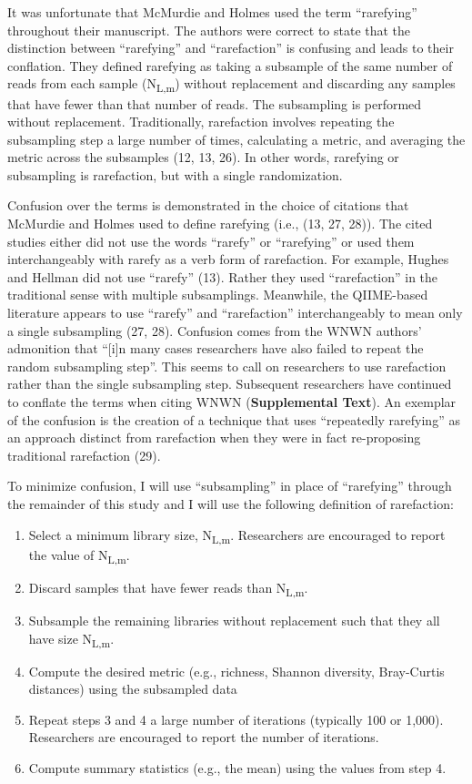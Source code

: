 \documentclass[
]{article}
\providecommand{\tightlist}{%
  \setlength{\itemsep}{0pt}\setlength{\parskip}{0pt}}
\begin{document}
It was unfortunate that McMurdie and Holmes used the term ``rarefying''
throughout their manuscript. The authors were correct to state that the
distinction between ``rarefying'' and ``rarefaction'' is confusing and
leads to their conflation. They defined rarefying as taking a subsample
of the same number of reads from each sample (N\textsubscript{L,m})
without replacement and discarding any samples that have fewer than that
number of reads. The subsampling is performed without replacement.
Traditionally, rarefaction involves repeating the subsampling step a
large number of times, calculating a metric, and averaging the metric
across the subsamples (12, 13, 26). In other words, rarefying or
subsampling is rarefaction, but with a single randomization.

Confusion over the terms is demonstrated in the choice of citations that
McMurdie and Holmes used to define rarefying (i.e., (13, 27, 28)). The
cited studies either did not use the words ``rarefy'' or ``rarefying''
or used them interchangeably with rarefy as a verb form of rarefaction.
For example, Hughes and Hellman did not use ``rarefy'' (13). Rather they
used ``rarefaction'' in the traditional sense with multiple
subsamplings. Meanwhile, the QIIME-based literature appears to use
``rarefy'' and ``rarefaction'' interchangeably to mean only a single
subsampling (27, 28). Confusion comes from the WNWN authors' admonition
that ``{[}i{]}n many cases researchers have also failed to repeat the
random subsampling step''. This seems to call on researchers to use
rarefaction rather than the single subsampling step. Subsequent
researchers have continued to conflate the terms when citing WNWN
(\textbf{Supplemental Text}). An exemplar of the confusion is the
creation of a technique that uses ``repeatedly rarefying'' as an
approach distinct from rarefaction when they were in fact re-proposing
traditional rarefaction (29).

To minimize confusion, I will use ``subsampling'' in place of
``rarefying'' through the remainder of this study and I will use the
following definition of rarefaction:

\begin{enumerate}
\def\labelenumi{\arabic{enumi}.}
\tightlist
\item
  Select a minimum library size, N\textsubscript{L,m}. Researchers are
  encouraged to report the value of N\textsubscript{L,m}.
\item
  Discard samples that have fewer reads than N\textsubscript{L,m}.
\item
  Subsample the remaining libraries without replacement such that they
  all have size N\textsubscript{L,m}.
\item
  Compute the desired metric (e.g., richness, Shannon diversity,
  Bray-Curtis distances) using the subsampled data
\item
  Repeat steps 3 and 4 a large number of iterations (typically 100 or
  1,000). Researchers are encouraged to report the number of iterations.
\item
  Compute summary statistics (e.g., the mean) using the values from step
  4.
\end{enumerate}
\end{document}
